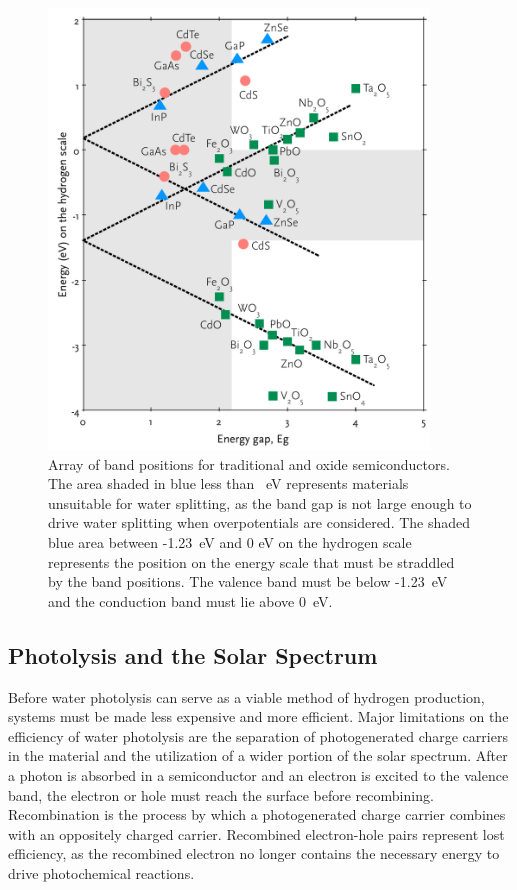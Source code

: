 \begin{figure}
	\begin{center}
	\includegraphics[width=0.9\textwidth]{morrisonarray.pdf}
	\caption[Array of band positions for semiconductors]{%
		Array of band positions for traditional and oxide semiconductors. 
		The area shaded in blue less than ~eV represents 
		materials unsuitable for water splitting, as the band gap is not 
		large enough to drive water splitting when overpotentials are 
		considered. The shaded blue area between -1.23~eV and 0 eV on the 
		hydrogen scale represents the position on the energy scale that 
		must be straddled by the band positions. The valence band must be 
		below -1.23~eV and the conduction band must lie above 0~eV.\cite{Morrison:1980va}}
	\label{fig:morrisonarray}
	\end{center}
\end{figure}


\subsection{Photolysis and the Solar Spectrum}
\label{subsec:background.solarspectrum}


Before water photolysis can serve as a viable method of hydrogen production, systems must
be made less expensive and more efficient. Major limitations on the efficiency of water
photolysis are the separation of photogenerated charge carriers in the material and the
utilization of a wider portion of the solar spectrum. After a photon is absorbed in a
semiconductor and an electron is excited to the valence band, the electron or hole must
reach the surface before recombining. Recombination is the process by which a
photogenerated charge carrier combines with an oppositely charged carrier. Recombined
electron-hole pairs represent lost efficiency, as the recombined electron no longer
contains the necessary energy to drive photochemical reactions. 



